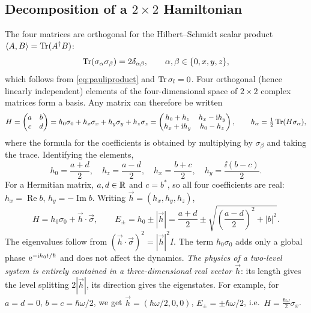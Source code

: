 \subsection{Decomposition of a $2\times2$ Hamiltonian}
The four matrices are orthogonal for the Hilbert--Schmidt scalar product $\langle A,B\rangle=\operatorname{Tr}(A^\dagger B)$:
\begin{equation}
  \operatorname{Tr}(\sigma_\alpha\sigma_\beta)=2\delta_{\alpha\beta},\qquad\alpha,\beta\in\{0,x,y,z\},
\end{equation}
which follows from \cref{eq:pauliproduct} and $\operatorname{Tr}\sigma_l=0$. Four orthogonal (hence linearly independent) elements of the
four-dimensional space of $2\times2$ complex matrices form a basis. Any matrix can therefore be written
\begin{equation}
  H=\begin{pmatrix}a&b\\c&d\end{pmatrix}=h_0\sigma_0+h_x\sigma_x+h_y\sigma_y+h_z\sigma_z
  =\begin{pmatrix}h_0+h_z&h_x-\mathrm i h_y\\h_x+\mathrm i h_y&h_0-h_z\end{pmatrix},\qquad h_\alpha=\tfrac12\operatorname{Tr}(H\sigma_\alpha),
\end{equation}
where the formula for the coefficients is obtained by multiplying by $\sigma_\beta$ and taking the trace. Identifying the elements,
\begin{equation}
  h_0=\frac{a+d}2,\quad h_z=\frac{a-d}2,\quad h_x=\frac{b+c}2,\quad h_y=\frac{\ii(b-c)}2.
\end{equation}
For a Hermitian matrix, $a,d\in\mathbb R$ and $c=b^*$, so all four coefficients are real: $h_x=\operatorname{Re}b$, $h_y=-\operatorname{Im}b$.
Writing $\vec h=(h_x,h_y,h_z)$,
\begin{equation}\label{eq:Hpauli}
  H=h_0\sigma_0+\vec h\cdot\vec\sigma,\qquad
  E_\pm=h_0\pm|\vec h|=\frac{a+d}2\pm\sqrt{\left(\frac{a-d}2\right)^2+|b|^2}.
\end{equation}
The eigenvalues follow from $(\vec h\cdot\vec\sigma)^2=|\vec h|^2I$. The term $h_0\sigma_0$ adds only a global phase $\mathrm e^{-\mathrm i h_0t/\hbar}$ and does not
affect the dynamics. \emph{The physics of a two-level system is entirely contained in a three-dimensional real vector $\vec h$}: its length gives
the level splitting $2|\vec h|$, its direction gives the eigenstates. For example, for $a=d=0$, $b=c=\hbar\omega/2$, we get
$\vec h=(\hbar\omega/2,0,0)$, $E_\pm=\pm\hbar\omega/2$, i.e.\ $H=\frac{\hbar\omega}2\sigma_x$.

